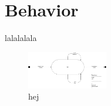 \section{Behavior}
lalalalala
\begin{figure}
\includegraphics[width=100pt]{input/problem_domain_analysis/Klasse_diagram_department.jpg}
\caption{hej}
\label{}
\end{figure}